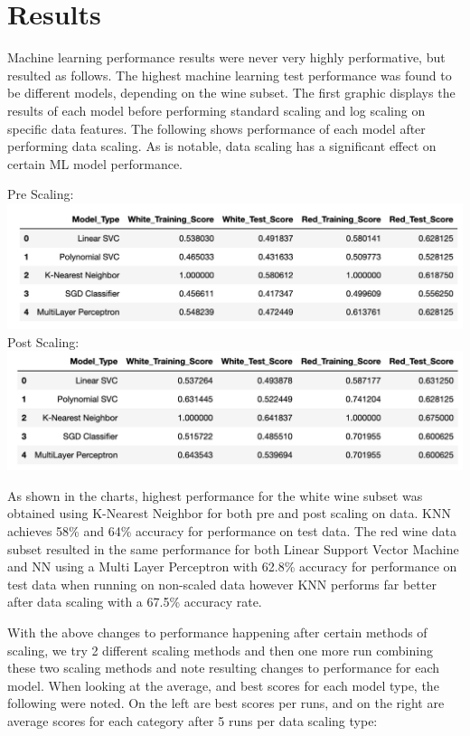\documentclass[titlepage]{article}
\begin{document}
	\section*{Results}
	Machine learning performance results were never very highly performative, but resulted as follows.  The highest machine learning test performance was found to be different models, depending on the wine subset.  The first graphic displays the results of each model before performing standard scaling and log scaling on specific data features.  The following shows performance of each model after performing data scaling.  As is notable, data scaling has a significant effect on certain ML model performance.  
	\begin{center}
		Pre Scaling:
		 \newline \includegraphics[width=.8\textwidth]{img/results.png}
		 \newline Post Scaling:
		 \newline \includegraphics[width=.8\textwidth]{img/postscaleresults2.png}
	\end{center}
	
As shown in the charts, highest performance for the white wine subset was obtained using K-Nearest Neighbor for both pre and post scaling on data. KNN achieves 58\% and 64\% accuracy for performance on test data.  The red wine data subset resulted in the same performance for both Linear Support Vector Machine and NN using a Multi Layer Perceptron with 62.8\% accuracy for performance on test data when running on non-scaled data however KNN performs far better after data scaling with a 67.5\% accuracy rate.

With the above changes to performance happening after certain methods of scaling, we try 2 different scaling methods and then one more run combining these two scaling methods and note resulting changes to performance for each model.   When looking at the average, and best scores for each model type, the following were noted.  On the left are best scores per runs, and on the right are average scores for each category after 5 runs per data scaling type:  
\end{document}
